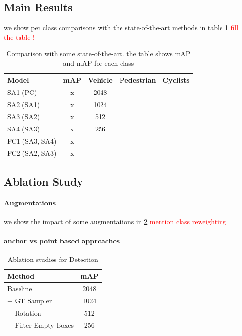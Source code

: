 \documentclass[10pt,twocolumn,letterpaper]{article}
\newcommand\myworries[1]{\textcolor{red}{#1}}
\begin{document}
\subsection{Main Results}
we show per class comparisons with the state-of-the-art methods in table \ref{tab:waymo_det_sota} \myworries{fill the table !}

\begin{table}
\begin{center}
\begin{tabular}{|l c c c c|}
\hline
Model & mAP & Vehicle & Pedestrian & Cyclists \\
\hline\hline
SA1 (PC) & x & 2048  \\
SA2 (SA1) & x & 1024  \\
SA3 (SA2) & x & 512  \\
SA4 (SA3) & x & 256  \\
FC1 (SA3, SA4) & x & -  \\
FC2 (SA2, SA3) & x & -  \\
\hline
\end{tabular}
\end{center}
\caption{Comparison with some state-of-the-art. the table shows mAP and mAP for each class}
\label{tab:waymo_det_sota}
\end{table}


\subsection{Ablation Study}

\paragraph{Augmentations.} we show the impact of some augmentations in \ref{tab:detection_ablation}
\myworries{mention class reweighting}

\paragraph{anchor vs point based approaches}

\begin{table}
\begin{center}
\begin{tabular}{|l c|}
\hline
Method & mAP \\
\hline\hline
Baseline & 2048  \\
+ GT Sampler & 1024  \\
+ Rotation & 512  \\
+ Filter Empty Boxes & 256  \\
\hline
\end{tabular}
\end{center}
\caption{Ablation studies for Detection}
\label{tab:detection_ablation}
\end{table}
\end{document}

